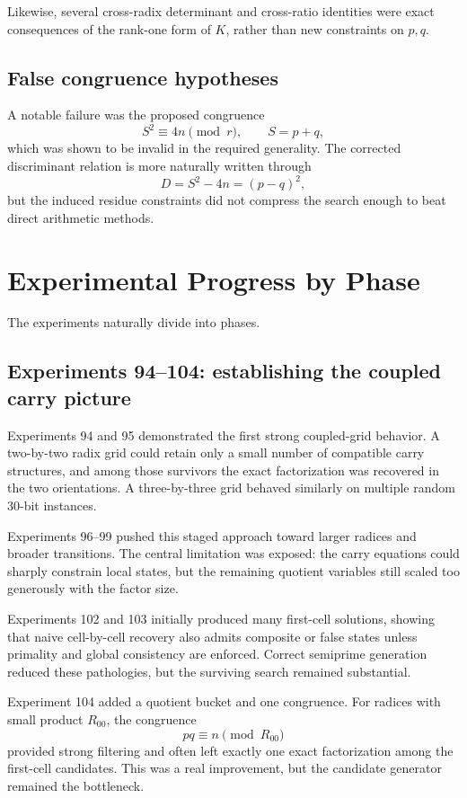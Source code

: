 \documentclass[11pt,a4paper]{article}
\begin{document}
Likewise, several cross-radix determinant and cross-ratio identities were exact consequences of the rank-one form of \(K\), rather than new constraints on \(p,q\).

\subsection{False congruence hypotheses}
A notable failure was the proposed congruence
\[
S^2\equiv4n\pmod r,
\qquad S=p+q,
\]
which was shown to be invalid in the required generality. The corrected discriminant relation is more naturally written through
\[
D=S^2-4n=(p-q)^2,
\]
but the induced residue constraints did not compress the search enough to beat direct arithmetic methods.

\section{Experimental Progress by Phase}
The experiments naturally divide into phases.

\subsection{Experiments 94--104: establishing the coupled carry picture}
Experiments 94 and 95 demonstrated the first strong coupled-grid behavior. A two-by-two radix grid could retain only a small number of compatible carry structures, and among those survivors the exact factorization was recovered in the two orientations. A three-by-three grid behaved similarly on multiple random 30-bit instances.

Experiments 96--99 pushed this staged approach toward larger radices and broader transitions. The central limitation was exposed: the carry equations could sharply constrain local states, but the remaining quotient variables still scaled too generously with the factor size.

Experiments 102 and 103 initially produced many first-cell solutions, showing that naive cell-by-cell recovery also admits composite or false states unless primality and global consistency are enforced. Correct semiprime generation reduced these pathologies, but the surviving search remained substantial.

Experiment 104 added a quotient bucket and one congruence. For radices with small product \(R_{00}\), the congruence
\[
pq\equiv n\pmod{R_{00}}
\]
provided strong filtering and often left exactly one exact factorization among the first-cell candidates. This was a real improvement, but the candidate generator remained the bottleneck.
\end{document}

